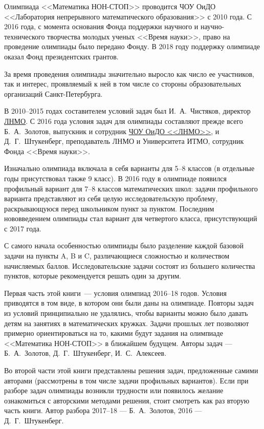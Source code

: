 \noindent\abz Олимпиада <<Математика НОН-СТОП>> проводится \hypertarget{lcme}{ЧОУ ОиДО <<Лаборатория непрерывного математического образования>>} с 2010 года. С 2016 года, с момента основания Фонда поддержки научного и научно-технического творчества молодых ученых <<Время науки>>, право на проведение олимпиады было передано Фонду. В 2018 году поддержку олимпиаде оказал Фонд президентских грантов. 

\aabz За время проведения олимпиады значительно выросло как число ее участников, так и интерес, проявляемый к ней в том числе со стороны образовательных организаций Санкт-Петербурга.

\aabz В 2010--2015 годах составителем условий задач был И.~А.~Чистяков, директор \hyperlink{lcme}{ЛНМО}. С 2016 года условия задач для олимпиады составляют прежде всего Б.~А.~Золотов, выпускник и сотрудник \hyperlink{lcme}{ЧОУ ОиДО <<ЛНМО>>}, и Д.~Г.~Штукенберг, преподаватель ЛНМО и Университета ИТМО, сотрудник Фонда <<Время науки>>.

\aabz Изначально олимпиада включала в себя варианты для 5--8 классов (в отдельные годы присутствовал также 9 класс). В 2016 году в олимпиаде появился профильный вариант для 7--8 классов математических школ: задачи профильного варианта представляют из себя целую исследовательскую проблему, раскрывающуюся перед школьником пункт за пунктом.  Последним нововведением олимпиады стал вариант для четвертого класса, присутствующий с 2017 года.

\aabz С самого начала особенностью олимпиады было разделение каждой базовой задачи на пункты A, B и C, различающиеся сложностью и количеством начисляемых баллов. Исследовательские задачи состоят из большего количества пунктов, которые рекомендуется решать один за другим.

\aabz Первая часть этой книги~--- условия олимпиад 2016--18 годов. Условия приводятся в том виде, в котором они были даны на олимпиаде. 
Повторы задач из условий принципиально не удалялись, чтобы варианты можно было давать детям на занятиях в математических кружках. Задачи прошлых лет позволяют примерно ориентироваться на то, какими будут задания на олимпиаде <<Математика НОН-СТОП>> в ближайшем будущем. Авторы задач — Б.~А.~Золотов, Д.~Г.~Штукенберг, И.~С.~Алексеев.

\aabz Во второй части этой книги представлены решения задач, предложенные самими авторами (рассмотрены в том числе задачи профильных вариантов). Если при разборе задач олимпиады возникли трудности или появилось желание ознакомиться с авторскими методами решения, стоит смотреть как раз вторую часть книги. Автор разбора 2017–18 — Б.~А.~Золотов, 2016 — Д.~Г.~Штукенберг.

